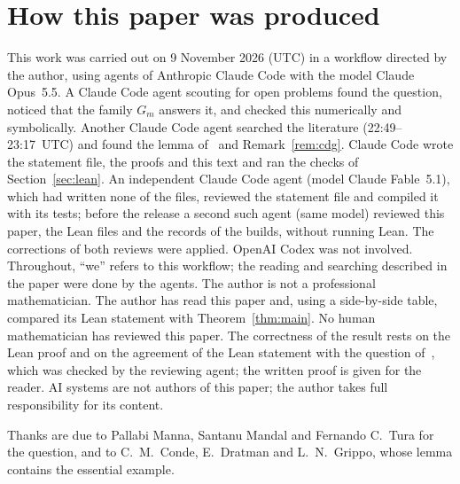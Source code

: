 \documentclass[11pt]{article}
\theoremstyle{remark}
\begin{document}
\section*{How this paper was produced}
This work was carried out on 9 November 2026 (UTC) in a workflow directed by the
author, using agents of Anthropic Claude Code with the model Claude Opus~5.5.
A Claude Code agent scouting for open problems found the question, noticed that
the family $G_m$ answers it, and checked this numerically and symbolically.
Another Claude Code agent searched the literature (22:49--23:17~UTC) and found
the lemma of~\cite{cdg} and Remark~\ref{rem:cdg}. Claude Code wrote the
statement file, the proofs and this text and ran the checks of
Section~\ref{sec:lean}. An independent Claude Code agent (model Claude
Fable~5.1), which had written none of the files, reviewed the statement file
and compiled it with its tests; before the release a second such agent (same
model) reviewed this paper, the Lean files and the records of the builds,
without running Lean. The corrections of both reviews were applied. OpenAI Codex was not involved.
Throughout, ``we'' refers to this workflow; the reading and searching described
in the paper were done by the agents. The author is not a professional
mathematician.
The author has read this paper and, using a side-by-side table, compared its Lean
statement with Theorem~\ref{thm:main}.
No human mathematician has reviewed this paper. The correctness of the result
rests on the Lean proof and on the agreement of the Lean statement with the
question of~\cite{mmt}, which was checked by the reviewing agent; the written
proof is given for the reader. AI systems are not authors of this paper; the
author takes full responsibility for its content.

\medskip
\noindent Thanks are due to Pallabi Manna, Santanu Mandal and Fernando C.\ Tura
for the question, and to C.~M.~Conde, E.~Dratman and L.~N.~Grippo, whose lemma contains the
essential example.
\end{document}
